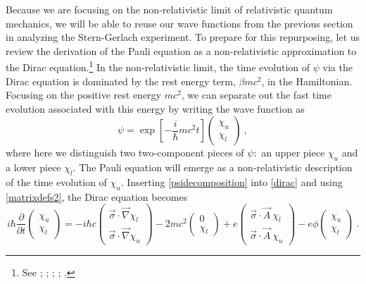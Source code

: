 \documentclass[12pt,secnumarabic,amsmath,amssymb,balancelastpage,nofootinbib]{article}
\begin{document}
Because we are focusing on the non-relativistic limit of relativistic quantum mechanics, we will be able to reuse our wave functions from the previous section in analyzing the Stern-Gerlach experiment.  To prepare for this repurposing, let us review the derivation of the Pauli equation as a non-relativistic approximation to the Dirac equation.\footnote{See \citet[sec.\ 1.4]{bjorkendrell}; \citet[sec.\ 33]{lifshitzRQM}; \citet[sec.\ 10.4]{bohmhiley}; \citet[sec.\ 2.6]{ryder}; \citet{nowakowski1999}.}  In the non-relativistic limit, the time evolution of $\psi$ via the Dirac equation is dominated by the rest energy term, $\beta m c^2$, in the Hamiltonian.  Focusing on the positive rest energy $m c^2$, we can separate out the fast time evolution associated with this energy by writing the wave function as
\begin{equation}
\psi= \exp\left[-\frac{i}{\hbar} m c^2 t \right] \left(\begin{matrix} \chi_u \\ \chi_l \end{matrix}\right)
\ ,
\label{psidecomposition}
\end{equation}
where here we distinguish two two-component pieces of $\psi$:\ an upper piece $\chi_u$ and a lower piece $\chi_l$.  The Pauli equation will emerge as a non-relativistic description of the time evolution of $\chi_u$.  Inserting \eqref{psidecomposition} into \eqref{dirac} and using \eqref{matrixdefs2}, the Dirac equation becomes
\begin{equation}
i \hbar \frac{\partial}{\partial t} \left(\begin{matrix} \chi_u \\ \chi_l \end{matrix}\right) =-i \hbar c \left(\begin{matrix} \vec{\sigma}\cdot\vec{\nabla} \chi_l \\ \vec{\sigma}\cdot\vec{\nabla}\chi_u \end{matrix}\right) - 2 m c^2 \left(\begin{matrix} 0 \\ \chi_l \end{matrix}\right) + e\left(\begin{matrix} \vec{\sigma}\cdot\vec{A}\: \chi_l \\ \vec{\sigma}\cdot\vec{A}\: \chi_u \end{matrix}\right)  - e \phi \left(\begin{matrix} \chi_u \\ \chi_l \end{matrix}\right)
\ .
\label{brokenupDirac}
\end{equation}
\end{document}
